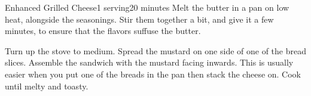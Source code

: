 \documentclass[../Cookbook.tex]{subfiles}
\begin{document}
\begin{recipe}[EnhancedGrilledCheese]{Enhanced Grilled Cheese}{1 serving}{20 minutes}
Melt the butter in a pan on low heat, alongside the seasonings.
Stir them together a bit, and give it a few minutes, to ensure that the flavors suffuse the butter. 

Turn up the stove to medium.
Spread the mustard on one side of one of the bread slices.
Assemble the sandwich with the mustard facing inwards.
This is usually easier when you put one of the breads in the pan then stack the cheese on.
Cook until melty and toasty.

\end{recipe}
\end{document}
